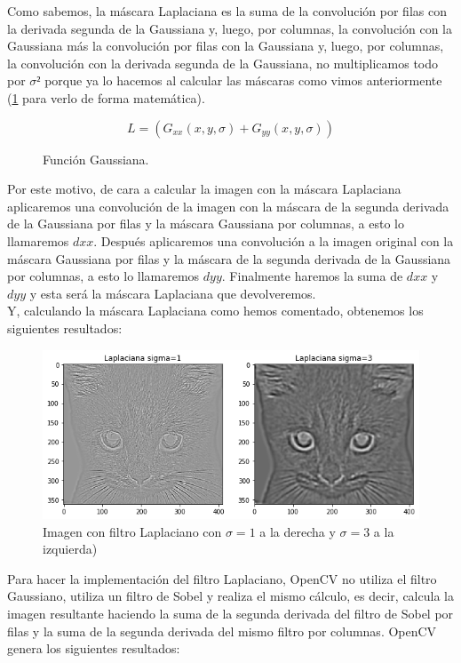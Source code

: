 \documentclass[12pt,spanish]{article}
\begin{document}
Como sabemos, la máscara Laplaciana es la suma de la convolución por filas con la derivada segunda de la Gaussiana y, luego, por columnas, la convolución con la Gaussiana más la convolución por filas con la Gaussiana y, luego, por columnas, la convolución con la derivada segunda de la Gaussiana, no multiplicamos todo por $\sigma²$ porque ya lo hacemos al calcular las máscaras como vimos anteriormente (\ref{f_laplaciana} para verlo de forma matemática).

\begin{figure}[H]
	\centering
	\[L = (G_{xx}(x,y,\sigma) + G_{yy}(x,y,\sigma)) \]
	\caption{Función Gaussiana.}
	\label{f_laplaciana}
\end{figure}

Por este motivo, de cara a calcular la imagen con la máscara Laplaciana aplicaremos una convolución de la imagen con la máscara de la segunda derivada de la Gaussiana por filas y la máscara Gaussiana por columnas, a esto lo llamaremos $dxx$. Después aplicaremos una convolución a la imagen original con la máscara Gaussiana por filas y la máscara de la segunda derivada de la Gaussiana por columnas, a esto lo llamaremos $dyy$. Finalmente haremos la suma de $dxx$ y $dyy$ y esta será la máscara Laplaciana que devolveremos. \\

Y, calculando la máscara Laplaciana como hemos comentado, obtenemos los siguientes resultados: 

\begin{figure}[H]
	\centering
	\includegraphics[width=\textwidth]{./imagenes_memoria/comp_sigma_laplaciana.png}
	\caption{Imagen con filtro Laplaciano con $\sigma=1$ a la derecha y $\sigma=3$ a la izquierda)}
	\label{comp_sigma_laplaciana}
\end{figure}

Para hacer la implementación del filtro Laplaciano, OpenCV no utiliza el filtro Gaussiano, utiliza un filtro de Sobel y realiza el mismo cálculo, es decir, calcula la imagen resultante haciendo la suma de la segunda derivada del filtro de Sobel por filas y la suma de la segunda derivada del mismo filtro por columnas. OpenCV genera los siguientes resultados:
\end{document}
